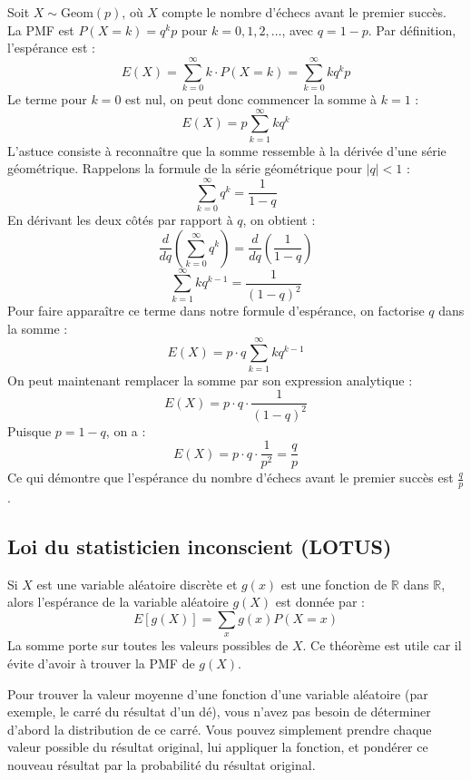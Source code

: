 \begin{proofbox}
Soit $X \sim \text{Geom}(p)$, où $X$ compte le nombre d'échecs avant le premier succès. La PMF est $P(X=k) = q^k p$ pour $k=0, 1, 2, \dots$, avec $q=1-p$.
\newline
Par définition, l'espérance est :
$$ E(X) = \sum_{k=0}^{\infty} k \cdot P(X=k) = \sum_{k=0}^{\infty} k q^k p $$
Le terme pour $k=0$ est nul, on peut donc commencer la somme à $k=1$ :
$$ E(X) = p \sum_{k=1}^{\infty} k q^k $$
L'astuce consiste à reconnaître que la somme ressemble à la dérivée d'une série géométrique. Rappelons la formule de la série géométrique pour $|q|<1$ :
$$ \sum_{k=0}^{\infty} q^k = \frac{1}{1-q} $$
En dérivant les deux côtés par rapport à $q$, on obtient :
$$ \frac{d}{dq} \left( \sum_{k=0}^{\infty} q^k \right) = \frac{d}{dq} \left( \frac{1}{1-q} \right) $$
$$ \sum_{k=1}^{\infty} k q^{k-1} = \frac{1}{(1-q)^2} $$
Pour faire apparaître ce terme dans notre formule d'espérance, on factorise $q$ dans la somme :
$$ E(X) = p \cdot q \sum_{k=1}^{\infty} k q^{k-1} $$
On peut maintenant remplacer la somme par son expression analytique :
$$ E(X) = p \cdot q \cdot \frac{1}{(1-q)^2} $$
Puisque $p = 1-q$, on a :
$$ E(X) = p \cdot q \cdot \frac{1}{p^2} = \frac{q}{p} $$
Ce qui démontre que l'espérance du nombre d'échecs avant le premier succès est $\frac{q}{p}$.
\end{proofbox}

\subsection{Loi du statisticien inconscient (LOTUS)}

\begin{theorembox}
Si $X$ est une variable aléatoire discrète et $g(x)$ est une fonction de $\mathbb{R}$ dans $\mathbb{R}$, alors l'espérance de la variable aléatoire $g(X)$ est donnée par :
$$ E[g(X)] = \sum_x g(x) P(X=x) $$
La somme porte sur toutes les valeurs possibles de $X$. Ce théorème est utile car il évite d'avoir à trouver la PMF de $g(X)$.
\end{theorembox}

\begin{intuitionbox}
Pour trouver la valeur moyenne d'une fonction d'une variable aléatoire (par exemple, le carré du résultat d'un dé), vous n'avez pas besoin de déterminer d'abord la distribution de ce carré. Vous pouvez simplement prendre chaque valeur possible du résultat original, lui appliquer la fonction, et pondérer ce nouveau résultat par la probabilité du résultat original.
\end{intuitionbox}

